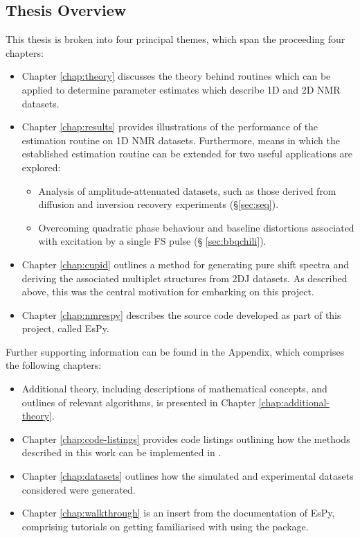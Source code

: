 \subsection{Thesis Overview}
This thesis is broken into four principal themes, which span the proceeding
four chapters:
\begin{itemize}
    \item Chapter \ref{chap:theory} discusses the theory behind routines which
        can be applied to determine parameter estimates which describe \ac{1D}
        and \ac{2D} \ac{NMR} datasets.
    \item Chapter \ref{chap:results} provides illustrations of the performance
        of the estimation routine on \ac{1D} \ac{NMR} datasets. Furthermore,
        means in which the established estimation routine can be extended for
        two useful applications are explored:
        \begin{itemize}
            \item Analysis of amplitude-attenuated datasets, such as those
                derived from diffusion and inversion recovery experiments
                (\S \ref{sec:seq}).
            \item Overcoming quadratic phase behaviour and baseline distortions
                associated with excitation by a single \acl{FS} pulse (\S
                \ref{sec:bbqchili}).
        \end{itemize}
    \item Chapter \ref{chap:cupid} outlines a method for generating pure shift
        spectra and deriving the associated multiplet structures from \ac{2DJ}
        datasets. As described above, this was the central motivation for
        embarking on this project.
    \item Chapter \ref{chap:nmrespy} describes the source code developed as
        part of this project, called \acs{EsPy}.
\end{itemize}

Further supporting information can be found in the Appendix, which comprises
the following chapters:
\begin{itemize}
    \item Additional theory, including descriptions of mathematical concepts,
        and outlines of relevant algorithms, is presented in Chapter
        \ref{chap:additional-theory}.
    \item Chapter \ref{chap:code-listings} provides code listings outlining how
        the methods described in this work can be implemented in \Python.
    \item Chapter \ref{chap:datasets} outlines how the simulated and
        experimental datasets considered were generated.
    \item Chapter \ref{chap:walkthrough} is an insert from the documentation of
        \ac{EsPy}, comprising tutorials on getting familiarised with using the
        package.
\end{itemize}
